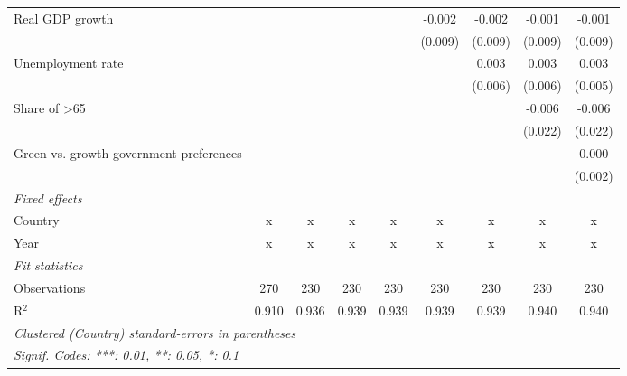 \begin{table}[htbp]
\begin{tabular}{lcccccccc}
      Real GDP growth                                                 &         &         &                &                & -0.002         & -0.002         & -0.001         & -0.001\\   
                                                                      &         &         &                &                & (0.009)        & (0.009)        & (0.009)        & (0.009)\\   
      Unemployment rate                                               &         &         &                &                &                & 0.003          & 0.003          & 0.003\\   
                                                                      &         &         &                &                &                & (0.006)        & (0.006)        & (0.005)\\   
      Share of >65                                                    &         &         &                &                &                &                & -0.006         & -0.006\\   
                                                                      &         &         &                &                &                &                & (0.022)        & (0.022)\\   
      Green vs. growth government preferences                         &         &         &                &                &                &                &                & 0.000\\   
                                                                      &         &         &                &                &                &                &                & (0.002)\\   
      \emph{Fixed effects}\\
      Country                                                         & x       & x       & x              & x              & x              & x              & x              & x\\  
      Year                                                            & x       & x       & x              & x              & x              & x              & x              & x\\  
      \midrule \emph{Fit statistics}\\
      Observations                                                    & 270     & 230     & 230            & 230            & 230            & 230            & 230            & 230\\  
      R$^2$                                                           & 0.910   & 0.936   & 0.939          & 0.939          & 0.939          & 0.939          & 0.940          & 0.940\\  
      \midrule
      \multicolumn{9}{l}{\emph{Clustered (Country) standard-errors in parentheses}}\\
      \multicolumn{9}{l}{\emph{Signif. Codes: ***: 0.01, **: 0.05, *: 0.1}}\\
   \end{tabular}
\end{table}


